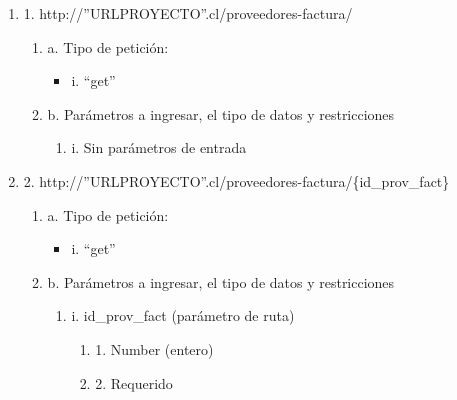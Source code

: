 \begin{enumerate}
    \item 1. http://”URLPROYECTO”.cl/proveedores-factura/
    \begin{enumerate}
        \item a. Tipo de petición:
            \begin{itemize}
               \item i. “get”
            \end{itemize}
        \item b. Parámetros a ingresar, el tipo de datos y restricciones
            \begin{enumerate}
                \item i. Sin parámetros de entrada
            \end{enumerate}
    \end{enumerate}

    \item 2. http://”URLPROYECTO”.cl/proveedores-factura/\{id\_prov\_fact\}
    \begin{enumerate}
        \item a. Tipo de petición:
            \begin{itemize}
               \item i. “get”
            \end{itemize}
        \item b. Parámetros a ingresar, el tipo de datos y restricciones
            \begin{enumerate}
                \item i. id\_prov\_fact (parámetro de ruta)
                    \begin{enumerate}
                        \item 1. Number (entero)
                        \item 2. Requerido
                    \end{enumerate}
            \end{enumerate}
    \end{enumerate}


\end{enumerate}
